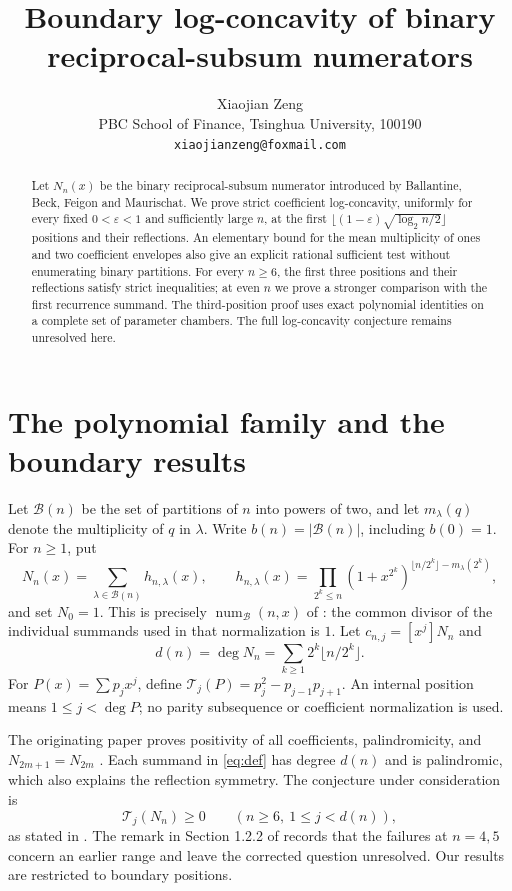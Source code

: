 \documentclass[11pt]{article}
\title{Boundary log-concavity of binary reciprocal-subsum numerators}
\author{Xiaojian Zeng\\[3pt]
\small PBC School of Finance, Tsinghua University, 100190\\
\small\texttt{xiaojianzeng@foxmail.com}}
\date{}
\newcommand{\B}{\mathcal B}
\newcommand{\T}{\mathcal T}
\DeclareMathOperator{\degp}{deg}
\begin{document}
\maketitle
\begin{abstract}
Let $N_n(x)$ be the binary reciprocal-subsum numerator introduced by
Ballantine, Beck, Feigon and Maurischat. We prove strict coefficient
log-concavity, uniformly for every fixed $0<\varepsilon<1$ and sufficiently
large $n$, at the first
$\lfloor(1-\varepsilon)\sqrt{\log_2 n/2}\rfloor$ positions and their
reflections. An elementary bound for the mean multiplicity of ones and two
coefficient envelopes also give an explicit rational sufficient test without
enumerating binary partitions. For every $n\ge6$, the first three positions
and their reflections satisfy strict inequalities; at even $n$ we prove a
stronger comparison with the first recurrence summand. The third-position
proof uses exact polynomial identities on a complete set of parameter
chambers. The full log-concavity conjecture remains unresolved here.
\end{abstract}

\section{The polynomial family and the boundary results}
Let $\B(n)$ be the set of partitions of $n$ into powers of two, and let
$m_\lambda(q)$ denote the multiplicity of $q$ in $\lambda$.
Write $b(n)=|\B(n)|$, including $b(0)=1$. For $n\ge1$, put
\begin{equation}\label{eq:def}
 N_n(x)=\sum_{\lambda\in\B(n)}h_{n,\lambda}(x),\qquad
 h_{n,\lambda}(x)=\prod_{2^k\le n}
 (1+x^{2^k})^{\lfloor n/2^k\rfloor-m_\lambda(2^k)},
\end{equation}
and set $N_0=1$. This is precisely $\operatorname{num}_{\B}(n,x)$ of
\cite[Remark 6]{BBFM}: the common divisor of the individual summands used
in that normalization is $1$.
Let $c_{n,j}=[x^j]N_n$ and
\[
 d(n)=\degp N_n=\sum_{k\ge1}2^k\lfloor n/2^k\rfloor.
\]
For $P(x)=\sum p_jx^j$, define
$\T_j(P)=p_j^2-p_{j-1}p_{j+1}$.
An internal position means $1\le j<\degp P$; no parity subsequence or
coefficient normalization is used.

The originating paper proves positivity of all coefficients,
palindromicity, and $N_{2m+1}=N_{2m}$
\cite[Proposition 4.1]{BBFM}. Each summand in \eqref{eq:def} has degree
$d(n)$ and is palindromic, which also explains the reflection symmetry.
The conjecture under consideration is
\begin{equation}\label{eq:original}
 \T_j(N_n)\ge0\qquad(n\ge6,\ 1\le j<d(n)),
\end{equation}
as stated in \cite[Conjecture 7]{BBFM}.
The remark in Section 1.2.2 of \cite[version 2]{COZ} records that the
failures at $n=4,5$ concern an earlier range and leave the corrected question
unresolved. Our results are restricted to boundary positions.
\end{document}
